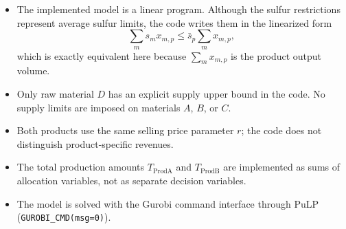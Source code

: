 \begin{itemize}
    \item The implemented model is a linear program. Although the sulfur restrictions represent average sulfur limits, the code writes them in the linearized form
    \[
    \sum_m s_m x_{m,p} \le \bar{s}_p \sum_m x_{m,p},
    \]
    which is exactly equivalent here because $\sum_m x_{m,p}$ is the product output volume.
    \item Only raw material $D$ has an explicit supply upper bound in the code. No supply limits are imposed on materials $A$, $B$, or $C$.
    \item Both products use the same selling price parameter $r$; the code does not distinguish product-specific revenues.
    \item The total production amounts $T_{\text{ProdA}}$ and $T_{\text{ProdB}}$ are implemented as sums of allocation variables, not as separate decision variables.
    \item The model is solved with the Gurobi command interface through PuLP (\texttt{GUROBI\_CMD(msg=0)}).
\end{itemize}
